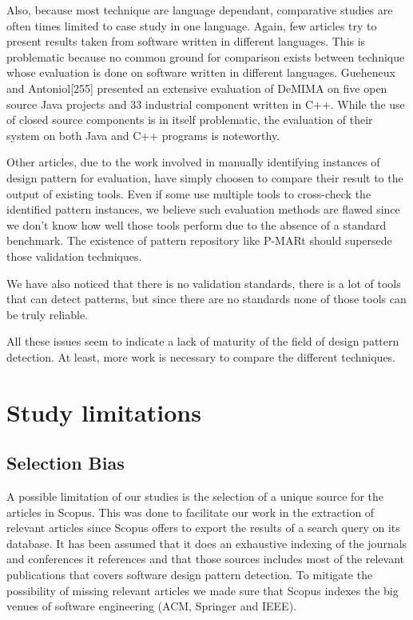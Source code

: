 \documentclass[letterpaper, 10 pt, conference]{ieeeconf}  %
\begin{document}
Also, because most technique are language dependant, comparative studies are
often times limited to case study in one language.
Again, few articles try to present results taken from software written in
different languages.
This is problematic because no common ground for comparison exists between
technique whose evaluation is done on software written in different languages.
Gueheneux and Antoniol[255] presented an extensive evaluation of DeMIMA on
five open source Java projects and 33 industrial component written in C++.
While the use of closed source components is in itself problematic, the
evaluation of their system on both Java and C++ programs is noteworthy.

Other articles, due to the work involved in manually identifying instances of
design pattern for evaluation, have simply choosen to compare their result to
the output of existing tools.
Even if some use multiple tools to cross-check the identified pattern instances,
we believe such evaluation methods are flawed since we don't know how well
those tools perform due to the absence of a standard benchmark.
The existence of pattern repository like P-MARt should supersede those
validation techniques.

We have also noticed that there is no validation standards, there is a lot
of tools that can detect patterns, but since there are no standards 
none of those tools can be truly reliable.

All these issues seem to indicate a lack of maturity of the field of design
pattern detection.
At least, more work is necessary to compare the different techniques.


\section{Study limitations}

\subsection{Selection Bias}

A possible limitation of our studies is the selection of a unique source for 
the articles in Scopus.
This was done to facilitate our work in the extraction of relevant articles
since Scopus offers to export the results of a search query on its database.
It has been assumed that it does an exhaustive indexing of the journals
and conferences it references and that those sources includes most of the
relevant publications that covers software design pattern detection.
To mitigate the possibility of missing relevant articles we made sure that
Scopus indexes the big venues of software engineering (ACM, Springer and IEEE).
\end{document}
